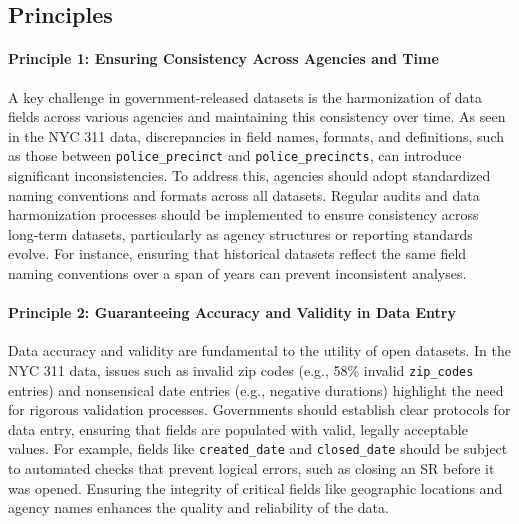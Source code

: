 \documentclass[linenumber]{jdsart}
\begin{document}
\subsection{Principles}
\paragraph{Principle 1: Ensuring Consistency Across Agencies and Time}
A key challenge in government-released datasets is the 
harmonization of data fields across various agencies and 
maintaining this consistency over time. As seen in the NYC 
311 data, discrepancies in field names, formats, and definitions, 
such as those between \texttt{police\_precinct} and 
\texttt{police\_precincts}, can introduce significant 
inconsistencies. To address this, agencies should adopt 
standardized naming conventions and formats across all datasets. 
Regular audits and data harmonization processes should be 
implemented to ensure consistency across long-term datasets, 
particularly as agency structures or reporting standards evolve. 
For instance, ensuring that historical datasets reflect the same 
field naming conventions over a span of years can prevent 
inconsistent analyses.

\paragraph{Principle 2: Guaranteeing Accuracy and Validity in Data Entry}
Data accuracy and validity are fundamental to the utility of 
open datasets. In the NYC 311 data, issues such as 
invalid zip codes (e.g., 58\% invalid \texttt{zip\_codes} entries) and 
nonsensical date entries (e.g., negative durations) highlight the need 
for rigorous validation processes. Governments should establish 
clear protocols for data entry, ensuring that fields are populated with 
valid, legally acceptable values. For example, fields like 
\texttt{created\_date} and \texttt{closed\_date} should be subject to 
automated checks that prevent logical errors, such as closing an 
SR before it was opened. Ensuring the integrity of critical fields 
like geographic locations and agency names enhances the quality 
and reliability of the data.
\end{document}
